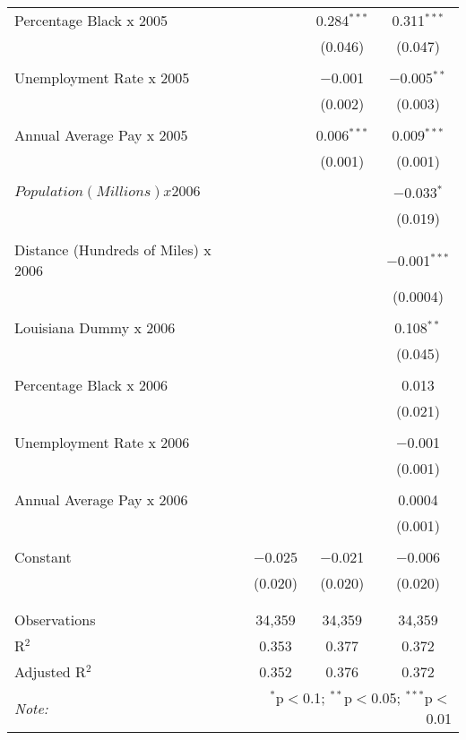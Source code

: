 \documentclass[]{article}
\begin{document}
\begin{table}[!htbp]
\begin{tabular}{@{\extracolsep{5pt}}lccc}
 Percentage Black x 2005 &  & 0.284$^{***}$ & 0.311$^{***}$ \\ 
  &  & (0.046) & (0.047) \\ 
  & & & \\ 
 Unemployment Rate x 2005 &  & $-$0.001 & $-$0.005$^{**}$ \\ 
  &  & (0.002) & (0.003) \\ 
  & & & \\ 
 Annual Average Pay x 2005 &  & 0.006$^{***}$ & 0.009$^{***}$ \\ 
  &  & (0.001) & (0.001) \\ 
  & & & \\ 
 $Population (Millions) x 2006$ &  &  & $-$0.033$^{*}$ \\ 
  &  &  & (0.019) \\ 
  & & & \\ 
 Distance (Hundreds of Miles) x 2006 &  &  & $-$0.001$^{***}$ \\ 
  &  &  & (0.0004) \\ 
  & & & \\ 
 Louisiana Dummy x 2006 &  &  & 0.108$^{**}$ \\ 
  &  &  & (0.045) \\ 
  & & & \\ 
 Percentage Black x 2006 &  &  & 0.013 \\ 
  &  &  & (0.021) \\ 
  & & & \\ 
 Unemployment Rate x 2006 &  &  & $-$0.001 \\ 
  &  &  & (0.001) \\ 
  & & & \\ 
 Annual Average Pay x 2006 &  &  & 0.0004 \\ 
  &  &  & (0.001) \\ 
  & & & \\ 
 Constant & $-$0.025 & $-$0.021 & $-$0.006 \\ 
  & (0.020) & (0.020) & (0.020) \\ 
  & & & \\ 
\hline \\[-1.8ex] 
Observations & 34,359 & 34,359 & 34,359 \\ 
R$^{2}$ & 0.353 & 0.377 & 0.372 \\ 
Adjusted R$^{2}$ & 0.352 & 0.376 & 0.372 \\  
\textit{Note:}  & \multicolumn{3}{r}{$^{*}$p$<$0.1; $^{**}$p$<$0.05; $^{***}$p$<$0.01} \\ 
\end{tabular} 
\end{table}
\end{document}

